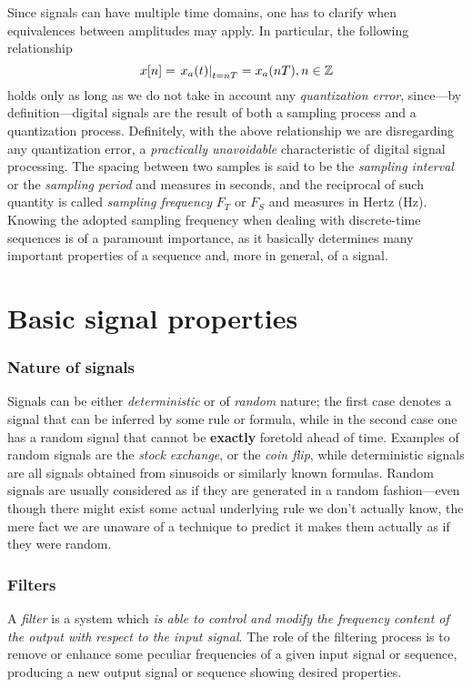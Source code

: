 \documentclass[\documentfontsize, twocolumn]{\classname}
\begin{document}
Since signals can have multiple time domains, one has to clarify when equivalences between amplitudes may apply. In particular, the following relationship \[ x[n] = \left. x_a(t)\right|_{t=nT} = x_a(nT), n \in \mathbb Z\] holds only as long as we do not take in account any \emph{quantization error}, since---by definition---digital signals are the result of both a sampling process and a quantization process. Definitely, with the above relationship we are disregarding any quantization error, a \emph{practically unavoidable} characteristic of digital signal processing. The spacing between two samples is said to be the \emph{sampling interval} or the \emph{sampling period} and measures in seconds, and the reciprocal of such quantity is called \emph{sampling frequency} $F_T$ or $F_S$ and measures in Hertz (Hz). Knowing the adopted sampling frequency when dealing with discrete-time sequences is of a paramount importance, as it basically determines many important properties of a sequence and, more in general, of a signal.

\section{Basic signal properties}

\subsubsection{Nature of signals}

Signals can be either \emph{deterministic} or of \emph{random} nature; the first case denotes a signal that can be inferred by some rule or formula, while in the second case one has a random signal that cannot be \textbf{exactly} foretold ahead of time.
Examples of random signals are the \emph{stock exchange}, or the \emph{coin flip}, while deterministic signals are all signals obtained from sinusoids or similarly known formulas.
Random signals are usually considered as if they are generated in a random fashion---even though there might exist some actual underlying rule we don't actually know, the mere fact we are unaware of a technique to predict it makes them actually as if they were random.

\subsubsection{Filters}

A \emph{filter} is a system which \emph{is able to control and modify the frequency content of the output with respect to the input signal}.
The role of the filtering process is to remove or enhance some peculiar frequencies of a given input signal or sequence, producing a new output signal or sequence showing desired properties.
\end{document}

